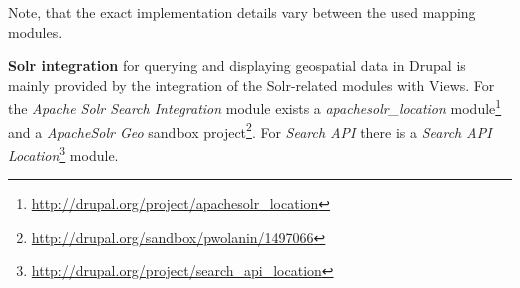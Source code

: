 Note, that the exact implementation details vary between the used mapping modules.

\textbf{Solr integration} for querying and displaying geospatial data in Drupal is mainly provided by the integration of the Solr-related modules with Views. For the \textit{Apache Solr Search Integration} module exists a \textit{apachesolr\_location} module\footnote{\url{http://drupal.org/project/apachesolr_location}} and a \textit{ApacheSolr Geo} sandbox project\footnote{\url{http://drupal.org/sandbox/pwolanin/1497066}}. For \textit{Search API} there is a \textit{Search API Location}\footnote{\url{http://drupal.org/project/search_api_location}} module.


